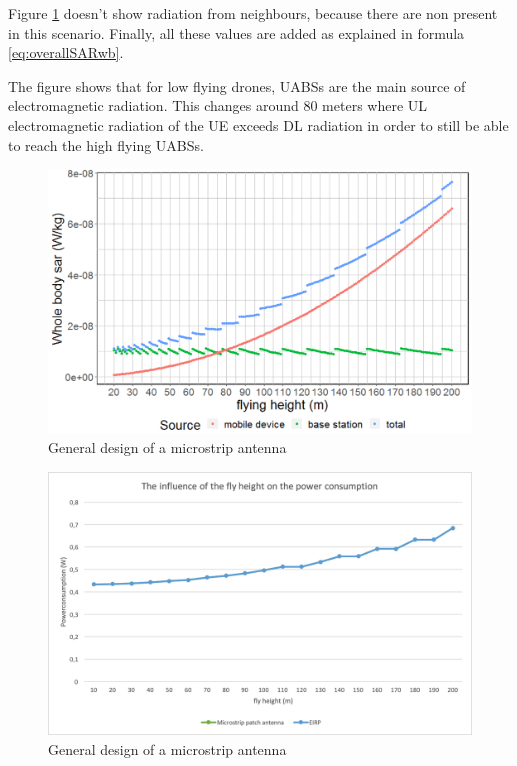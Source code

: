 Figure \ref{fig:s1_fhsar} doesn't show radiation from neighbours, because there are non present in this scenario. Finally, all these values are added as explained in formula
\ref{eq:overallSARwb}. 

The figure shows that for low flying drones, \gls{UABS}s are the main source of electromagnetic radiation.
This changes around 80 meters where \gls{UL} electromagnetic radiation of the \gls{UE}
exceeds \gls{DL} radiation in order to still be able to reach the high flying \gls{UABS}s.


\begin{figure}[th!]
  \includegraphics[width=\textwidth]{../results/s1/fhvssar2.png}
  \caption{General design of a microstrip antenna}
  \label{fig:s1_fhsar}
\end{figure}

\begin{figure}[bh!]
  \includegraphics[width=\textwidth]{../results/s1/flyheight-pc.png}
  \caption{General design of a microstrip antenna}
  \label{fig:pcsar}
\end{figure}



